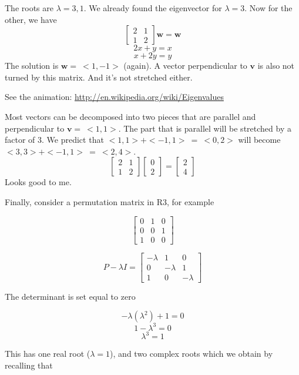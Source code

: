 \documentclass[11pt, oneside]{article}
\begin{document}
The roots are $\lambda = 3, 1$.  We already found the eigenvector for $\lambda=3$.  Now for the other, we have
\[
\begin{bmatrix}
2 & 1  \\  
1 & 2  
\end{bmatrix}
\mathbf{w}
= \mathbf{w}
\]
\[ 2x + y = x \]
\[ x + 2y = y \]
The solution is $\mathbf{w} = \ <1,-1>$ (again).  A vector perpendicular to $\mathbf{v}$ is also not turned by this matrix.  And it's not stretched either.
\vspace{5 mm}

See the animation:
\url{http://en.wikipedia.org/wiki/Eigenvalues}
\vspace{5 mm}

Most vectors can be decomposed into two pieces that are parallel and perpendicular to $\mathbf{v} = \ <1,1>$.  The part that is parallel will be stretched by a factor of 3.  We predict that $<1,1> + <-1,1> \ = \ <0,2>$ will become $<3,3> + <-1,1> \ = \ <2,4>$.
\[
\begin{bmatrix}
2 & 1  \\  
1 & 2  
\end{bmatrix}
\begin{bmatrix}
0  \\  
2  
\end{bmatrix}
=
\begin{bmatrix}
2  \\  
4  
\end{bmatrix}
\]
Looks good to me.

Finally, consider a permutation matrix in R3, for example

\[
\begin{bmatrix}
0 & 1 & 0  \\  
0 & 0 & 1  \\  
1 & 0 & 0 
\end{bmatrix}
\]

\[
P -\lambda I = 
\begin{bmatrix}
-\lambda & 1 & 0  \\  
0 & -\lambda & 1  \\  
1 & 0 & -\lambda 
\end{bmatrix}
\]

The determinant is set equal to zero

\[ -\lambda(\lambda^2) + 1 = 0 \]
\[ 1 - \lambda^3 = 0 \]
\[ \lambda^3 = 1 \]

This has one real root ($\lambda = 1$), and two complex roots which we obtain by recalling that
\end{document}
